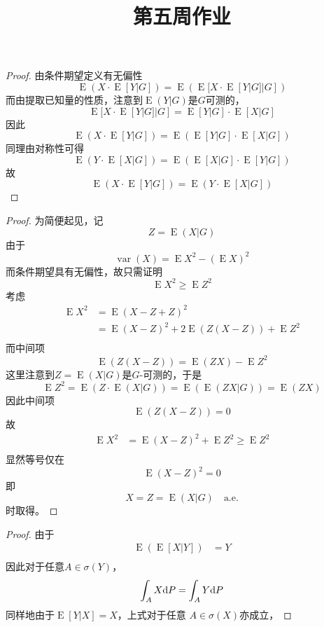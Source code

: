 \documentclass[cn]{homework}
\title{第五周作业}
\DeclareMathOperator{\E}{E}
\DeclareMathOperator{\var}{var}
\begin{document}
    \maketitle

    \problem
    \begin{proof}
        由条件期望定义有无偏性
        \[\E(X\cdot \E[Y|G])=\E(\E[X\cdot \E[Y|G]|G])\]
        而由提取已知量的性质，注意到$\E(Y|G)$是$G$可测的，
        \[\E[X\cdot \E[Y|G]|G]=\E[Y|G]\cdot \E[X|G]\]
        因此
        \[\E(X\cdot \E[Y|G])=\E(\E[Y|G]\cdot \E[X|G])\]
        同理由对称性可得
        \[\E(Y\cdot \E[X|G])=\E(\E[X|G]\cdot \E[Y|G])\]
        故
        \[\E(X\cdot \E[Y|G])=\E(Y\cdot \E[X|G])\]
    \end{proof}

    \problem
    \begin{subproblem}
        \item
        \begin{proof}
            为简便起见，记
            \[Z=\E(X|G)\]
            由于
            \[\var(X)=\E X^2-(\E X)^2\]
            而条件期望具有无偏性，故只需证明
            \[\E X^2\geq \E Z^2\]
            考虑
            \[\begin{aligned}
                \E X^2&=\E(X-Z+Z)^2\\
                &=\E(X-Z)^2+2\E(Z(X-Z))+\E Z^2\\
            \end{aligned}\]
            而中间项
            \[\E(Z(X-Z))=\E(ZX)-\E Z^2\]
            这里注意到$Z=\E(X|G)$是$G$-可测的，于是
            \[\E Z^2=\E(Z\cdot\E(X|G))=\E(\E(ZX|G))=\E(ZX)\]
            因此中间项
            \[\E(Z(X-Z))=0\]
            故
            \[\begin{aligned}
                \E X^2&=\E(X-Z)^2+\E Z^2\geq \E Z^2\\
            \end{aligned}\]
            显然等号仅在
            \[\E (X-Z)^2=0\]
            即
            \[X=Z=\E(X|G)\quad\text{a.e.}\]
            时取得。
        \end{proof}

        \item
        \begin{proof}
            由于
            \[\begin{aligned}
                \E(\E[X|Y])&=Y\\
            \end{aligned}\]
            因此对于任意$A\in\sigma(Y)$，
            \[\int_AX\mathrm d P=\int_AY\mathrm d P\]
            同样地由于$\E[Y|X]=X$，上式对于任意
            $A\in\sigma(X)$亦成立，


\end{proof}
\end{subproblem}
\end{document}
